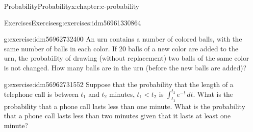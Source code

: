 \documentclass[twoside,10pt,]{book}
\numberwithin{equation}{section}
\newcommand{\lt}{<}
\begin{document}
\begin{chapterptx}{Probability}{}{Probability}{}{}{x:chapter:c-probability}
\begin{exercises-section}{Exercises}{}{Exercises}{}{}{g:exercises:idm56961330864}
\begin{divisionexercise}{12}{}{}{g:exercise:idm56962732400}%
An urn contains a number of colored balls, with the same number of balls in each color. If 20 balls of a new color are added to the urn, the probability of drawing (without replacement) two balls of the same color is not changed. How many balls are in the urn (before the new balls are added)?%
\end{divisionexercise}%
\begin{divisionexercise}{13}{}{}{g:exercise:idm56962731552}%
Suppose that the probability that the length of a telephone call is between \(t_1\) and \(t_2\) minutes,  \(t_1 \lt t_2\) is \(\int_{t_1}^{t_2} e^{-t} \, dt\).   What is the probability that a phone call lasts less than one minute.  What is the probability that a phone call lasts less than two minutes given that it lasts at least one minute?%
\end{divisionexercise}%
\end{exercises-section}
\end{chapterptx}
%
%
\typeout{************************************************}
\typeout{************************************************}
%
\end{document}
